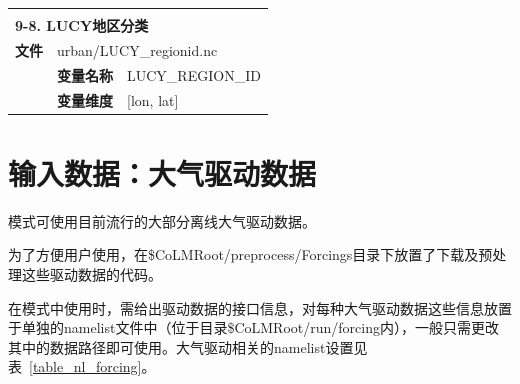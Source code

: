 \documentclass[a4paper,12pt,twoside]{article}
\begin{document}
{\begin{longtable}{llp{}}
\midrule
\vspace{2\baselineskip}\\
\multicolumn{3}{l}{\textbf{9-8. LUCY地区分类}} \\
\cline{1-3}
\textbf{文件} & \multicolumn{2}{l}{urban/LUCY\_regionid.nc} \\
\cline{2-3}
& \textbf{变量名称} & LUCY\_REGION\_ID \\
& \textbf{变量维度} & {[}lon, lat{]} \\

\end{longtable}}

\section{输入数据：大气驱动数据}

模式可使用目前流行的大部分离线大气驱动数据。\par
为了方便用户使用，在\$CoLMRoot/preprocess/Forcings目录下放置了下载及预处理这些驱动数据的代码。\par
在模式中使用时，需给出驱动数据的接口信息，对每种大气驱动数据这些信息放置于单独的namelist文件中（位于目录\$CoLMRoot/run/forcing内），一般只需更改其中的数据路径即可使用。大气驱动相关的namelist设置见表~\ref{table_nl_forcing}。
\end{document}
